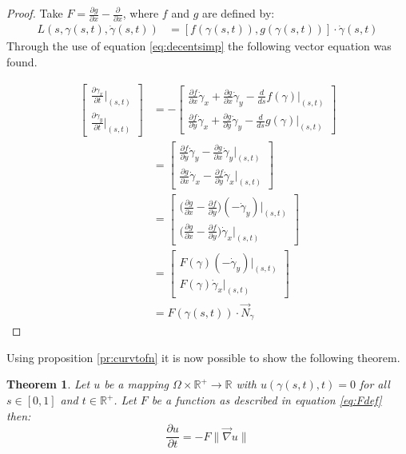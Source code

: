 \documentclass{article}
\newcommand{\R}{\mathds{R}}
\newtheorem{thm}{Theorem}
\begin{document}
			\begin{proof}
				Take $F = \frac{\partial g}{\partial x} - \frac{\partial}{\partial x}$, where $f$ and $g$ are defined by:
				\begin{align}\label{eq:Fdef}
				    L(s,\gamma(s,t),\dot\gamma(s,t)) &= [f(\gamma(s,t)),g(\gamma(s,t))]\cdot \dot\gamma(s,t)
				\end{align}
				Through the use of equation \ref{eq:decentsimp} the following vector equation was found.

				\begin{align*}
    				\begin{bmatrix}
    					\frac{\partial \gamma_x}{\partial t}\biggr\rvert_{(s,t)}\\
    					\frac{\partial \gamma_y}{\partial t}\biggr\rvert_{(s,t)}
    				\end{bmatrix} 
    				&= - \begin{bmatrix}
    					\frac{\partial f}{\partial x}\dot\gamma_x + \frac{\partial g}{\partial x}\dot\gamma_y - \frac{d}{ds} f(\gamma)\biggr\rvert_{(s,t)}\\
    					\frac{\partial f}{\partial y}\dot\gamma_x + \frac{\partial g}{\partial y}\dot\gamma_y - \frac{d}{ds} g(\gamma)\biggr\rvert_{(s,t)}
    				\end{bmatrix}\\
    				&=  \begin{bmatrix}
    					\frac{\partial f}{\partial y}\dot\gamma_y - \frac{\partial g}{\partial x}\dot\gamma_y\biggr\rvert_{(s,t)}\\
    					\frac{\partial g}{\partial x}\dot\gamma_x - \frac{\partial f}{\partial y}\dot\gamma_x\biggr\rvert_{(s,t)}
    				\end{bmatrix}\\
    				&=  \begin{bmatrix}
    					\bigg(\frac{\partial g}{\partial x} - \frac{\partial f}{\partial y}\bigg)(-\dot\gamma_y)\biggr\rvert_{(s,t)}\\
    					\bigg(\frac{\partial g}{\partial x} - \frac{\partial f}{\partial y}\bigg)\dot\gamma_x\biggr\rvert_{(s,t)}
    				\end{bmatrix}\\
    				&=  \begin{bmatrix}
    					F(\gamma)(-\dot\gamma_y)\biggr\rvert_{(s,t)}\\
    					F(\gamma)\dot\gamma_x\biggr\rvert_{(s,t)}
    				\end{bmatrix}\\
    				&=F(\gamma(s,t))\cdot \vec N_\gamma
				\end{align*}
			\end{proof}
			Using proposition \ref{pr:curvtofn} it is now possible to show the following theorem.
			\begin{thm}\label{th:levelset}
				Let $u$ be a mapping $\Omega\times\R^+\rightarrow\R$ with $u(\gamma(s,t),t) = 0$ for all $s\in[0,1]$ and $t\in\R^+$. Let $F$ be a function as described in equation \ref{eq:Fdef} then:
				\begin{equation}\label{eq:ulevelset}
					\frac{\partial u}{\partial t} = -F\|\vec\nabla u\|
				\end{equation}
			\end{thm}
\end{document}
